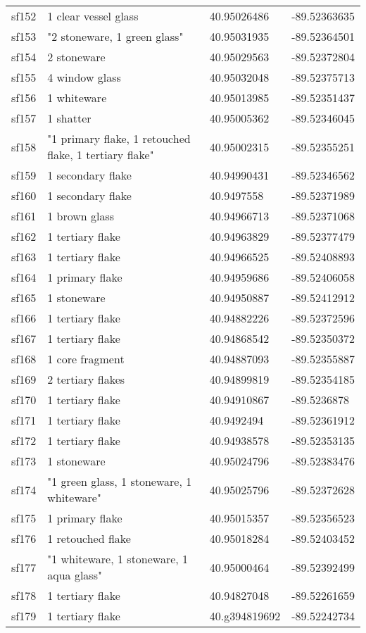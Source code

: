 \begin{longtable}{p{1cm}p{6cm}ll}
	sf152 & 1 clear vessel glass & 40.95026486 & -89.52363635\\
	sf153 & "2 stoneware, 1 green glass" & 40.95031935 & -89.52364501\\
	sf154 & 2 stoneware & 40.95029563 & -89.52372804\\
	sf155 & 4 window glass & 40.95032048 & -89.52375713\\
	sf156 & 1 whiteware & 40.95013985 & -89.52351437\\
	sf157 & 1 shatter & 40.95005362 & -89.52346045\\
	sf158 & "1 primary flake, 1 retouched flake, 1 tertiary flake" & 40.95002315 & -89.52355251\\
	sf159 & 1 secondary flake & 40.94990431 & -89.52346562\\
	sf160 & 1 secondary flake & 40.9497558 & -89.52371989\\
	sf161 & 1 brown glass & 40.94966713 & -89.52371068\\
	sf162 & 1 tertiary flake & 40.94963829 & -89.52377479\\
	sf163 & 1 tertiary flake & 40.94966525 & -89.52408893\\
	sf164 & 1 primary flake & 40.94959686 & -89.52406058\\
	sf165 & 1 stoneware & 40.94950887 & -89.52412912\\
	sf166 & 1 tertiary flake & 40.94882226 & -89.52372596\\
	sf167 & 1 tertiary flake & 40.94868542 & -89.52350372\\
	sf168 & 1 core fragment & 40.94887093 & -89.52355887\\
	sf169 & 2 tertiary flakes & 40.94899819 & -89.52354185\\
	sf170 & 1 tertiary flake & 40.94910867 & -89.5236878\\
	sf171 & 1 tertiary flake & 40.9492494 & -89.52361912\\
	sf172 & 1 tertiary flake & 40.94938578 & -89.52353135\\
	sf173 & 1 stoneware & 40.95024796 & -89.52383476\\
	sf174 & "1 green glass, 1 stoneware, 1 whiteware" & 40.95025796 & -89.52372628\\
	sf175 & 1 primary flake & 40.95015357 & -89.52356523\\
	sf176 & 1 retouched flake & 40.95018284 & -89.52403452\\
	sf177 & "1 whiteware, 1 stoneware, 1 aqua glass" & 40.95000464 & -89.52392499\\
	sf178 & 1 tertiary flake & 40.94827048 & -89.52261659\\
	sf179 & 1 tertiary flake & 40.g394819692 & -89.52242734\\


\end{longtable}

